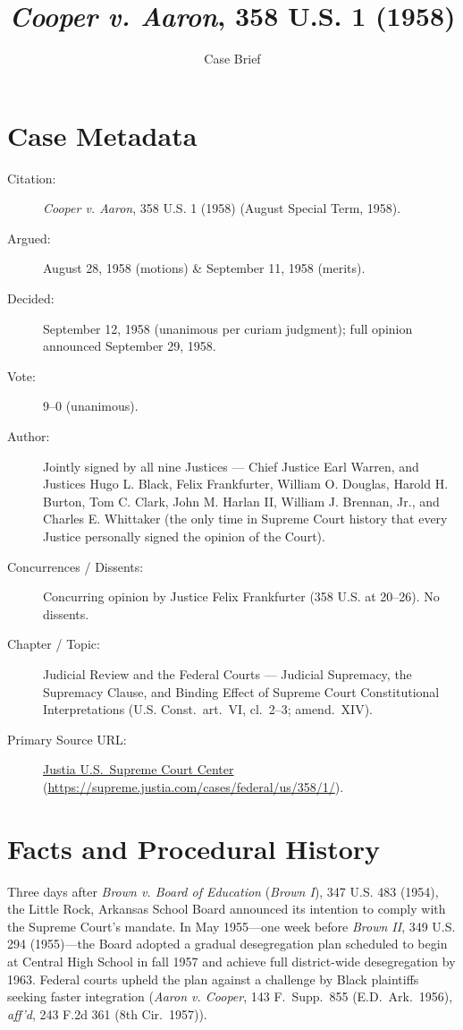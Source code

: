 \documentclass[12pt]{article}
\title{\textit{Cooper v. Aaron}, 358 U.S. 1 (1958)}
\author{Case Brief}
\date{}
\begin{document}
\maketitle

\section{Case Metadata}
\begin{description}
  \item[Citation:] \textit{Cooper v. Aaron}, 358 U.S. 1 (1958) (August Special Term, 1958).
  \item[Argued:] August 28, 1958 (motions) \& September 11, 1958 (merits).
  \item[Decided:] September 12, 1958 (unanimous per curiam judgment); full opinion announced September 29, 1958.
  \item[Vote:] 9--0 (unanimous).
  \item[Author:] Jointly signed by all nine Justices --- Chief Justice Earl Warren, and Justices Hugo L. Black, Felix Frankfurter, William O. Douglas, Harold H. Burton, Tom C. Clark, John M. Harlan II, William J. Brennan, Jr., and Charles E. Whittaker (the only time in Supreme Court history that every Justice personally signed the opinion of the Court).
  \item[Concurrences / Dissents:] Concurring opinion by Justice Felix Frankfurter (358 U.S. at 20--26). No dissents.
  \item[Chapter / Topic:] Judicial Review and the Federal Courts --- Judicial Supremacy, the Supremacy Clause, and Binding Effect of Supreme Court Constitutional Interpretations (U.S. Const.\ art.\ VI, cl.~2--3; amend.\ XIV).
  \item[Primary Source URL:] \href{https://supreme.justia.com/cases/federal/us/358/1/}{Justia U.S.\ Supreme Court Center} (\url{https://supreme.justia.com/cases/federal/us/358/1/}).
\end{description}

\section{Facts and Procedural History}
Three days after \textit{Brown v. Board of Education} (\textit{Brown I}), 347 U.S. 483 (1954), the Little Rock, Arkansas School Board announced its intention to comply with the Supreme Court's mandate. In May 1955---one week before \textit{Brown II}, 349 U.S. 294 (1955)---the Board adopted a gradual desegregation plan scheduled to begin at Central High School in fall 1957 and achieve full district-wide desegregation by 1963. Federal courts upheld the plan against a challenge by Black plaintiffs seeking faster integration (\textit{Aaron v. Cooper}, 143 F.\ Supp.\ 855 (E.D.\ Ark.\ 1956), \textit{aff'd}, 243 F.2d 361 (8th Cir.\ 1957)).
\end{document}
